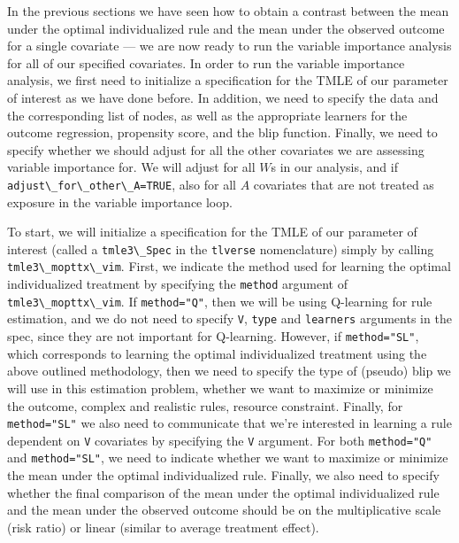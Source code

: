 \documentclass[
  12pt, krantz2,
]{krantz}
\newcommand{\passthrough}[1]{#1}
\newcommand{\1}{\mathbbm{1}}
\theoremstyle{definition}
\theoremstyle{definition}
\theoremstyle{definition}
\theoremstyle{definition}
\theoremstyle{remark}
\begin{document}
In the previous sections we have seen how to obtain a contrast between the mean
under the optimal individualized rule and the mean under the observed outcome
for a single covariate --- we are now ready to run the variable importance analysis
for all of our specified covariates. In order to run the variable importance
analysis, we first need to initialize a specification for the TMLE of our
parameter of interest as we have done before. In addition, we need to specify
the data and the corresponding list of nodes, as well as the appropriate
learners for the outcome regression, propensity score, and the blip function.
Finally, we need to specify whether we should adjust for all the other
covariates we are assessing variable importance for. We will adjust for all \(W\)s
in our analysis, and if \passthrough{\lstinline!adjust\_for\_other\_A=TRUE!}, also for all \(A\) covariates
that are not treated as exposure in the variable importance loop.

To start, we will initialize a specification for the TMLE of our parameter of
interest (called a \passthrough{\lstinline!tmle3\_Spec!} in the \passthrough{\lstinline!tlverse!} nomenclature) simply by calling
\passthrough{\lstinline!tmle3\_mopttx\_vim!}. First, we indicate the method used for learning the optimal
individualized treatment by specifying the \passthrough{\lstinline!method!} argument of
\passthrough{\lstinline!tmle3\_mopttx\_vim!}. If \passthrough{\lstinline!method="Q"!}, then we will be using Q-learning for rule
estimation, and we do not need to specify \passthrough{\lstinline!V!}, \passthrough{\lstinline!type!} and \passthrough{\lstinline!learners!} arguments
in the spec, since they are not important for Q-learning. However, if
\passthrough{\lstinline!method="SL"!}, which corresponds to learning the optimal individualized
treatment using the above outlined methodology, then we need to specify the type
of (pseudo) blip we will use in this estimation problem, whether we want to
maximize or minimize the outcome, complex and realistic rules, resource constraint.
Finally, for \passthrough{\lstinline!method="SL"!} we also need to communicate that we're interested in learning a
rule dependent on \passthrough{\lstinline!V!} covariates by specifying the \passthrough{\lstinline!V!} argument. For both
\passthrough{\lstinline!method="Q"!} and \passthrough{\lstinline!method="SL"!}, we need to indicate whether we want to maximize
or minimize the mean under the optimal individualized rule. Finally, we also
need to specify whether the final comparison of the mean under the optimal
individualized rule and the mean under the observed outcome should be on the
multiplicative scale (risk ratio) or linear (similar to average treatment
effect).
\end{document}
